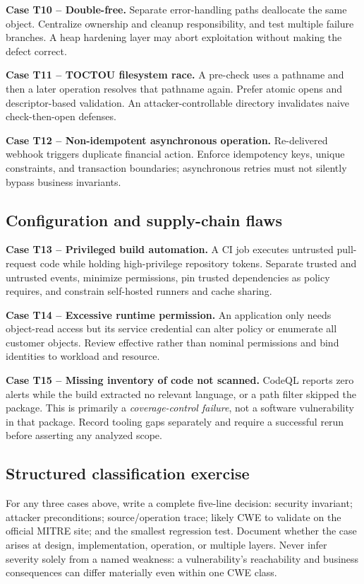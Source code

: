 \documentclass[
  letterpaper,
]{article}
\begin{document}
\textbf{Case T10 -- Double-free.} Separate error-handling paths
deallocate the same object. Centralize ownership and cleanup
responsibility, and test multiple failure branches. A heap hardening
layer may abort exploitation without making the defect correct.

\textbf{Case T11 -- TOCTOU filesystem race.} A pre-check uses a pathname
and then a later operation resolves that pathname again. Prefer atomic
opens and descriptor-based validation. An attacker-controllable
directory invalidates naive check-then-open defenses.

\textbf{Case T12 -- Non-idempotent asynchronous operation.} Re-delivered
webhook triggers duplicate financial action. Enforce idempotency keys,
unique constraints, and transaction boundaries; asynchronous retries
must not silently bypass business invariants.

\subsection{Configuration and supply-chain
flaws}\label{configuration-and-supply-chain-flaws}

\textbf{Case T13 -- Privileged build automation.} A CI job executes
untrusted pull-request code while holding high-privilege repository
tokens. Separate trusted and untrusted events, minimize permissions, pin
trusted dependencies as policy requires, and constrain self-hosted
runners and cache sharing.

\textbf{Case T14 -- Excessive runtime permission.} An application only
needs object-read access but its service credential can alter policy or
enumerate all customer objects. Review effective rather than nominal
permissions and bind identities to workload and resource.

\textbf{Case T15 -- Missing inventory of code not scanned.} CodeQL
reports zero alerts while the build extracted no relevant language, or a
path filter skipped the package. This is primarily a
\emph{coverage-control failure}, not a software vulnerability in that
package. Record tooling gaps separately and require a successful rerun
before asserting any analyzed scope.

\subsection{Structured classification
exercise}\label{structured-classification-exercise}

For any three cases above, write a complete five-line decision: security
invariant; attacker preconditions; source/operation trace; likely CWE to
validate on the official MITRE site; and the smallest regression test.
Document whether the case arises at design, implementation, operation,
or multiple layers. Never infer severity solely from a named weakness: a
vulnerability's reachability and business consequences can differ
materially even within one CWE class.
\end{document}
